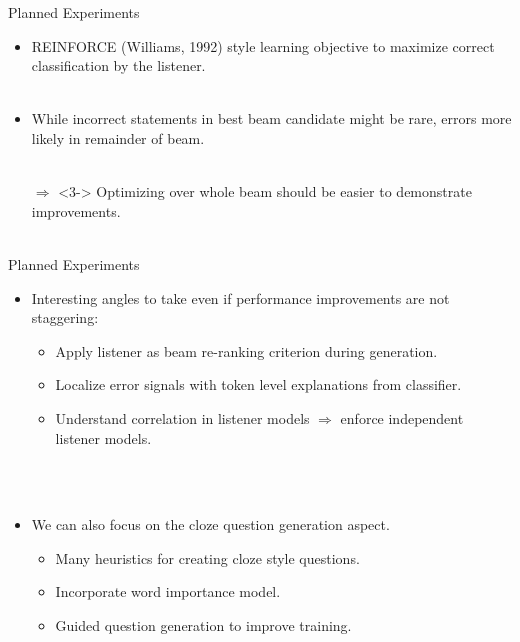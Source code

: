 \begin{frame}{Planned Experiments}
    \begin{itemize}
        \item REINFORCE (Williams, 1992) style learning objective to maximize
            correct classification by the listener.~\\~\\
        \item<2-> While incorrect statements in best beam candidate might be rare, errors more likely in remainder of beam.~\\~\\
        \item[$\Rightarrow$]<3-> Optimizing over whole beam should be easier to demonstrate 
            improvements. ~\\~\\
    \end{itemize}
\end{frame}

\begin{frame}{Planned Experiments}
    \begin{itemize}
        \item Interesting angles to take even if performance improvements are not staggering:
            \begin{itemize}
                \item<1-> Apply listener as 
                    beam re-ranking criterion during generation.

                \item<2-> Localize error signals with token level explanations 
                    from classifier.
                \item<3-> Understand correlation in listener models $\Rightarrow$ 
                    enforce independent listener models.
               \end{itemize}


               ~\\~\\
           \item<4-> We can also focus on the cloze question generation aspect.
            \begin{itemize}
                \item Many heuristics for creating cloze style questions.
                \item Incorporate word importance model.
                \item Guided question generation to improve training.
            \end{itemize}

    \end{itemize}
   
    

\end{frame}


